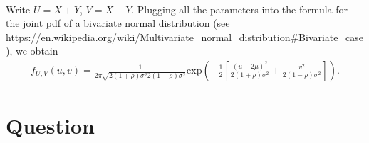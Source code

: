 \begin{exercise}
\begin{solution}
\begin{enumerate}
\begin{align}
    \end{align}
    Write $U = X+Y$, $V = X - Y$. Plugging all the parameters into the formula for the joint pdf of a bivariate normal distribution (see \url{https://en.wikipedia.org/wiki/Multivariate_normal_distribution#Bivariate_case}), we obtain
    \begin{align}
        f_{U,V}(u,v) = \frac{1}{2\pi\sqrt{2(1+\rho)\sigma^2 2(1-\rho)\sigma^2} } \text{exp}\left(-\frac{1}{2}\left[\frac{(u - 2\mu)^2}{2(1+\rho)\sigma^2} + \frac{v^2}{2(1-\rho)\sigma^2} \right]\right).
    \end{align}
\end{enumerate}
\end{solution}
\end{exercise}

\section{Question}
\label{sec:question-3}



